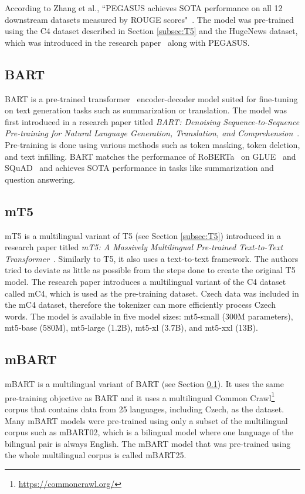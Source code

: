 \documentclass[english, ba, kiv, he, iso690numb, pdf, viewonly]{fasthesis}
\begin{document}
	According to Zhang et al., “PEGASUS achieves SOTA performance on all 12 downstream datasets measured by ROUGE scores"~\cite{zhang2019pegasus}. The model was pre-trained using the C4 dataset described in Section \ref{subsec:T5} and the HugeNews dataset, which was introduced in the research paper~\cite{zhang2019pegasus} along with PEGASUS.
	\subsection{BART} \label{subsec:BART}
	BART is a pre-trained transformer~\cite{vaswani2023attention} encoder-decoder model suited for fine-tuning on text generation tasks such as summarization or translation. The model was first introduced in a research paper titled \textit{BART: Denoising Sequence-to-Sequence Pre-training for Natural Language Generation, Translation, and Comprehension}~\cite{lewis2019bart}. Pre-training is done using various methods such as token masking, token deletion, and text infilling. BART matches the performance of RoBERTa~\cite{liu2019roberta} on GLUE~\cite{wang-etal-2018-glue} and SQuAD~\cite{rajpurkar2016squad} and achieves SOTA performance in tasks like summarization and question answering.
	
	\subsection{mT5}
	mT5 is a multilingual variant of T5 (see Section \ref{subsec:T5}) introduced in a research paper titled \textit{mT5: A Massively Multilingual Pre-trained Text-to-Text Transformer}~\cite{xue-etal-2021-mt5}. Similarly to T5, it also uses a text-to-text framework. The authors tried to deviate as little as possible from the steps done to create the original T5 model. The research paper introduces a multilingual variant of the C4 dataset called mC4, which is used as the pre-training dataset. Czech data was included in the mC4 dataset, therefore the tokenizer can more efficiently process Czech words.
	The model is available in five model sizes: mt5-small (300M parameters), mt5-base (580M), mt5-large (1.2B), mt5-xl (3.7B), and mt5-xxl (13B).
	
	\subsection{mBART}
	mBART is a multilingual variant of BART (see Section \ref{subsec:BART}). It uses the same pre-training objective as BART and it uses a multilingual Common Crawl\footnote{\url{https://commoncrawl.org/}} corpus that contains data from 25 languages, including Czech, as the dataset. Many mBART models were pre-trained using only a subset of the multilingual corpus such as mBART02, which is a bilingual model where one language of the bilingual pair is always English. The mBART model that was pre-trained using the whole multilingual corpus is called mBART25.
	
\end{document}
